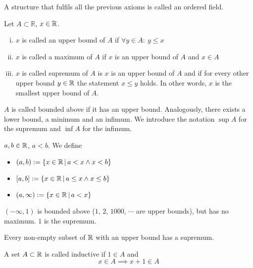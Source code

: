 \documentclass[../../script.tex]{subfiles}
\begin{document}
\begin{rem}
A structure that fulfils all the  previous axioms is called an ordered field.
\end{rem}

\begin{defi}
Let $A \subset \mathbb{R}$, $x \in \mathbb{R}$.
\begin{enumerate}[(i)]
	\item $x$ is called an upper bound of $A$ if $\forall y \in A: ~y \le x$
	
	\item $x$ is called a maximum of $A$ if $x$ is an upper bound of $A$ and $x \in A$
	
	\item $x$ is called supremum of $A$ is $x$ is an upper bound of $A$ and if for every other upper bound $y \in \mathbb{R}$ the statement $x \le y$ holds. In other words, $x$ is the smallest upper bound of $A$.
\end{enumerate}
$A$ is called bounded above if it has an upper bound. Analogously, there exists a lower bound, a minimum and an infimum. We introduce the notation $\sup A$ for the supremum and $\inf A$ for the infimum.
\end{defi}

\begin{defi}
$a, b \in \mathbb{R}$, $a < b$. We define
\begin{itemize}
	\item $(a, b) := \{x \in \mathbb{R} \,\vert\, a < x \wedge x < b\}$
	
	\item $[a, b] := \{x \in \mathbb{R} \,\vert\, a \le x \wedge x \le b\}$
	
	\item $(a, \infty) := \{x \in \mathbb{R} \,\vert\, a < x\}$
\end{itemize}
\end{defi}

\begin{eg}
	$(-\infty, 1)$ is bounded above ($1$, $2$, $1000$, $\cdots$ are upper bounds), but has no maximum. $1$ is the supremum.
\end{eg}

\begin{defi}
Every non-empty subset of $\mathbb{R}$ with an upper bound has a supremum.
\end{defi}

\begin{defi}
A set $A \subset \mathbb{R}$ is called inductive if $1 \in A$ and 
\[
	x \in A \implies x + 1 \in A
\]
\end{defi}
\end{document}
